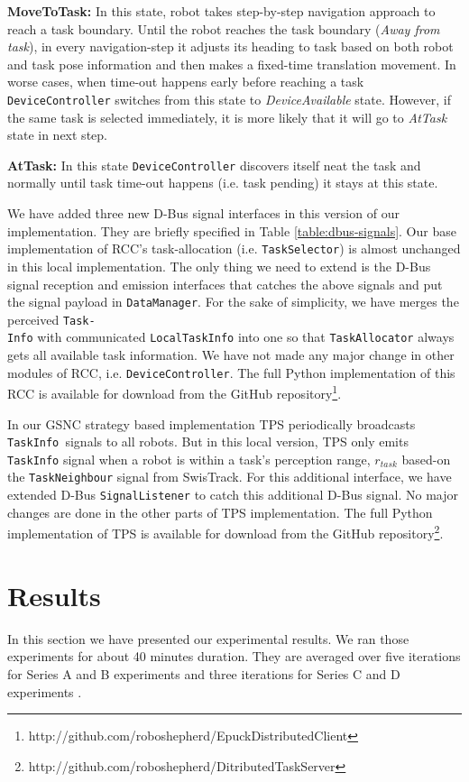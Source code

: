 \documentclass[final,5p,times,twocolumn]{elsarticle}
\begin{document}
\textbf{MoveToTask: }
In this state, robot takes step-by-step navigation approach to reach a task boundary. Until the robot reaches the task boundary ({\em Away from task}), in every navigation-step it adjusts its heading to task based on both  robot and task pose information and then makes a fixed-time translation movement. In worse cases, when time-out happens early before reaching a task  \texttt{DeviceController} switches from this state to\textit{ DeviceAvailable} state. However, if the same task is selected immediately, it is more likely that it will go to \textit{AtTask} state in next step.

\textbf{AtTask: }
In this state  \texttt{DeviceController} discovers itself neat the task and normally until task time-out happens (i.e. task pending) it stays at this state.

We have added three new D-Bus signal interfaces in this version of our implementation. They are briefly specified in Table \ref{table:dbus-signals}. Our base implementation of RCC's task-allocation (i.e. \texttt{TaskSelector}) is almost unchanged in this local implementation. The only thing we need to extend is the D-Bus signal reception and emission interfaces that catches the above signals and put the signal payload in \texttt{DataManager}. For the sake of simplicity, we have merges the perceived \texttt{Task-}\\ \texttt{Info} with communicated \texttt{LocalTaskInfo} into one so that \texttt{TaskAllocator} always gets all available task information. We have not made any major change in other modules of RCC, i.e. \texttt{DeviceController}. The full Python implementation of this RCC is available for download from the GitHub repository\footnote{http://github.com/roboshepherd/EpuckDistributedClient }.

In our GSNC strategy based implementation TPS periodically broadcasts \texttt{TaskInfo }signals to all robots. But in this local version, TPS only emits \texttt{TaskInfo} signal when a robot is within a task's perception range, $r_{task}$ based-on the \texttt{TaskNeighbour} signal from SwisTrack. For this additional interface, we have extended D-Bus \texttt{SignalListener} to catch this additional D-Bus signal.  No major changes are done in the other parts of TPS implementation. The full Python implementation of TPS is available for download from the GitHub repository\footnote{http://github.com/roboshepherd/DitributedTaskServer}.
\section{Results}
\label{sec:res}
In this section we have presented our experimental results. We ran those experiments for about 40 minutes duration.  They are averaged over five iterations for Series A and B experiments and three iterations for Series C and D experiments . 
\end{document}

